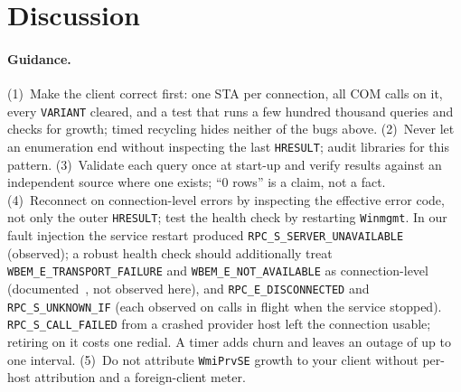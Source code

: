 \documentclass[letterpaper,twocolumn,10pt]{article}
\newcommand{\code}[1]{\texttt{\small #1}}
\newcommand{\hr}[1]{\texttt{\small #1}}
\begin{document}
\section{Discussion}\label{sec:discussion}
\paragraph{Guidance.}
(1)~Make the client correct first: one STA per connection, all COM calls on it, every \code{VARIANT} cleared, and a test that runs a few hundred thousand queries and checks for growth; timed recycling hides neither of the bugs above.
(2)~Never let an enumeration end without inspecting the last \code{HRESULT}; audit libraries for this pattern.
(3)~Validate each query once at start-up and verify results against an independent source where one exists; ``0 rows'' is a claim, not a fact.
(4)~Reconnect on connection-level errors by inspecting the effective error code, not only the outer \code{HRESULT}; test the health check by restarting \code{Winmgmt}.
In our fault injection the service restart produced \hr{RPC\_S\_SERVER\_UNAVAILABLE} (observed); a robust health check should additionally treat \hr{WBEM\_E\_TRANSPORT\_FAILURE} and \hr{WBEM\_E\_NOT\_AVAILABLE} as connection-level (documented~\cite{ms-wmierr}, not observed here), and \hr{RPC\_E\_DISCONNECTED} and \hr{RPC\_S\_UNKNOWN\_IF} (each observed on calls in flight when the service stopped).
\hr{RPC\_S\_CALL\_FAILED} from a crashed provider host left the connection usable; retiring on it costs one redial.
A timer adds churn and leaves an outage of up to one interval.
(5)~Do not attribute \code{WmiPrvSE} growth to your client without per-host attribution and a foreign-client meter.
\end{document}
